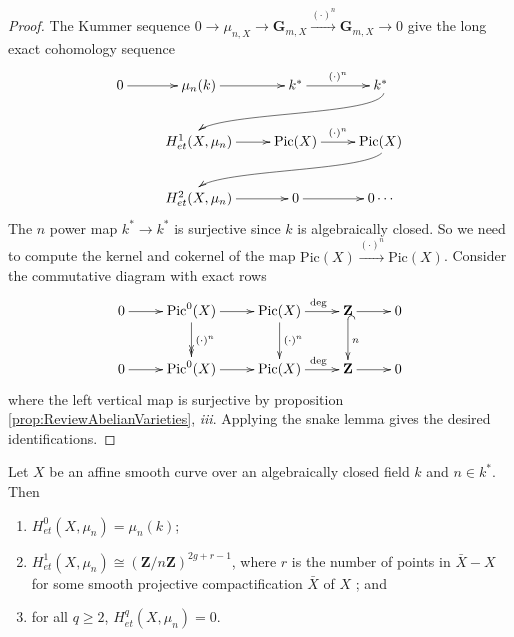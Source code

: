 \begin{proof} 
The Kummer sequence $0\to \mu_{n, X} \to \mathbf{G}_{m, X} 
\xrightarrow{(\cdot)^n} \mathbf{G}_{m, X}\to 0$ give the long exact cohomology 
sequence
$$
\xymatrix{
0  \ar[r] & \mu_n(k) \ar[r] & k^* \ar^{(\cdot)^n}[r] & k^* \ar@(rd,ul)[rdllllr]
\\ 
& H_{et}^1(X, \mu_n) \ar[r] & \text{Pic}(X) \ar^{(\cdot)^n}[r] & \text{Pic} (X) 
\ar@(rd,ul)[rdllllr] \\
& H_{et}^2(X, \mu_n) \ar[r] & 0 \ar[r] & 0 \cdots
}
$$
The $n$ power map $k^* \to k^*$ is surjective since $k$ is algebraically 
closed. So we need to compute the kernel and cokernel of the map $\text{Pic}(X) 
\xrightarrow{(\cdot)^n} \text{Pic}(X)$. Consider the commutative diagram with 
exact rows
$$
\xymatrix{
0 \ar[r] & {\text{Pic}^0(X)} \ar[r] \ar^{(\cdot)^n}@{>>}[d] & {\text{Pic}(X)} 
\ar^{\ \ \deg}[r] \ar^{(\cdot)^n}[d] & {\mathbf{Z}} \ar[r] \ar^{n}@{^{(}->}[d] 
& 0\\
0 \ar[r] & {\text{Pic}^0(X)} \ar[r] & {\text{Pic}(X)} \ar^{\ \ \deg}[r] & 
{\mathbf{Z}} \ar[r] & 0 
}
$$
where the left vertical map is surjective by proposition 
\ref{prop:ReviewAbelianVarieties}, {\it iii}. Applying the snake lemma gives 
the desired identifications.
\end{proof}

\begin{lemma} \label{cor:VanishingOfMuForASmoothCurve}
Let $X$ be an affine smooth curve over an algebraically closed field $k$ and 
$n\in k^*$. Then
\begin{enumerate}
\item 
$H_{et}^0(X, \mu_n) = \mu_n(k)$;
\item
$H_{et}^1(X, \mu_n) \cong \left(\mathbf{Z}/n\mathbf{Z}\right)^{2g+r-1}$, where 
$r$ is the number of points in $\bar X - X$ for some smooth projective 
compactification $\bar X$ of $X$ ; and
\item
for all $q\geq 2$, $H_{et}^q(X, \mu_n) = 0$.
\end{enumerate}
\end{lemma}


